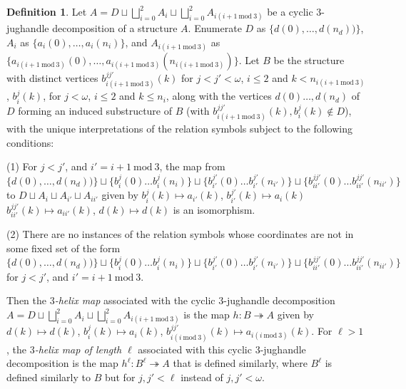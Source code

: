 \documentclass{amsart}
\theoremstyle{definition}
\newtheorem{definition}[theorem]{Definition}
\theoremstyle{remark}
\numberwithin{equation}{section}
\begin{document}
\begin{definition}
  \label{jughandle helix map}  Let $A= D \sqcup \bigsqcup^{2}_{i = 0} A_{i} \sqcup \bigsqcup^{2}_{i = 0} A_{i(i+1\mathrm{\:mod\:} 3)}$ be a cyclic $3$-jughandle decomposition of a structure $A$. Enumerate $D$ as $\{d(0), \ldots, d(n_{d}))\}$,  $A_{i}$ as $\{a_{i}(0), \ldots, a_{i}(n_{i})\}$, and $A_{i(i+1\mathrm{\:mod\:} 3)}$ as $\{a_{i(i+1\mathrm{\:mod\:} 3)}(0), \ldots, a_{i(i+1\mathrm{\:mod\:} 3)}(n_{i(i+1\mathrm{\:mod\:} 3)})\}$. Let $B$ be the structure with distinct vertices $b^{jj'}_{i(i+1\mathrm{\:mod\:} 3)}(k)$ for $j < j' < \omega$, $i \leq 2$ and $k <n_{i(i+1\mathrm{\:mod\:} 3)}$,  $b^{j}_{i}(k)$, for $j < \omega$, $i \leq 2$ and $k \leq n_{i}$, along with the vertices $d(0) \ldots, d(n_{d})$ of $D$ forming an induced substructure of $B$ (with $b^{jj'}_{i(i+1\mathrm{\:mod\:} 3)}(k), b^{j}_{i}(k) \notin D$), with the unique interpretations of the relation symbols subject to the following conditions:

    (1) For $j < j'$, and $i' = i + 1 \mathrm{\: mod \:} 3$, the map from $\{d(0), \ldots, d(n_{d}))\} \sqcup \{b^{j}_{i}(0)\ldots b^{j}_{i}(n_{i})\} \sqcup \{b^{j'}_{i'}(0)\ldots b^{j'}_{i'}(n_{i'})\} \sqcup  \{b^{jj'}_{ii'}(0)\ldots b^{jj'}_{ii'}(n_{ii'})\}$ to $ D  \sqcup A_{i} \sqcup A_{i'} \sqcup A_{ii'}$ given by $b^{j}_{i}(k) \mapsto a_{i'}(k)$, $b^{j'}_{i'}(k) \mapsto a_{i}(k)$ $b^{jj'}_{ii'}(k) \mapsto a_{ii'}(k)$, $d(k) \mapsto d(k)$ is an isomorphism.


    (2) There are no instances of the relation symbols whose coordinates are not in some fixed set of the form $\{d(0), \ldots, d(n_{d}))\} \sqcup \{b^{j}_{i}(0)\ldots b^{j}_{i}(n_{i})\} \sqcup \{b^{j'}_{i'}(0)\ldots b^{j'}_{i'}(n_{i'})\} \sqcup  \{b^{jj'}_{ii'}(0)\ldots b^{jj'}_{ii'}(n_{ii'})\}$ for $j < j'$, and $i' = i + 1 \mathrm{\: mod \:} 3$.


    Then the \textit{$3$-helix map} associated with the cyclic $3$-jughandle decomposition $A= D \sqcup \bigsqcup^{2}_{i = 0} A_{i} \sqcup \bigsqcup^{2}_{i = 0} A_{i(i+1\mathrm{\:mod\:} 3)}$ is the map $h: B \twoheadrightarrow A$ given by $d(k) \mapsto d(k)$, $b^{j}_{i}(k) \mapsto a_{i}(k)$, $b_{i(i \mathrm{\: mod\:} 3)}^{jj'}(k) \mapsto a_{i(i \mathrm{\: mod\:} 3)}(k) $. For $\ell > 1$, the \emph{$3$-helix map of length $\ell$} associated with this cyclic $3$-jughandle decomposition is the map $h^{\ell}: B^{\ell} \twoheadrightarrow A$ that is defined similarly, where $B^{\ell}$ is defined similarly to $B$ but for $j, j' < \ell$ instead of $j, j' < \omega$.
\end{definition}
\end{document}

